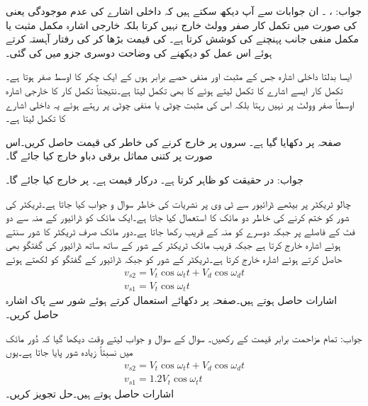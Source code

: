 جواب: ،  ۔ ان جوابات سے آپ دیکھ سکتے ہیں کہ داخلی اشارے کی عدم موجودگی یعنی   کی صورت میں تکمل کار صفر وولٹ خارج نہیں کرتا بلکہ خارجی اشارہ مکمل مثبت یا مکمل منفی جانب پہنچنے کی کوشش کرتا ہے۔ کی قیمت بڑھا کر   کی رفتار آہستہ کرتے ہوئے اس عمل کو دیکھنے کی وضاحت دوسری جزو میں کی گئی۔

ایسا بدلتا داخلی اشارہ جس کے مثبت اور منفی حصے  برابر ہوں کے ایک چکر کا اوسط صفر ہوتا ہے۔تکمل کار ایسے اشارے کا تکمل لیتے ہوئے  کا بھی تکمل لیتا ہے۔نتیجتاً تکمل کار کا خارجی اشارہ اوسطاً صفر وولٹ پر نہیں رہتا بلکہ اس کی مثبت چوٹی  یا منفی چوٹی  پر رہتے ہوئے یہ داخلی اشارے کا تکمل لیتا ہے۔

صفحہ  پر  دکھایا گیا ہے۔ سروں  پر  خارج کرنے کی خاطر  کی قیمت حاصل کریں۔اس صورت   پر کتنی مماثل برقی دباو خارج کیا جائے گا۔

جواب: در حقیقت  کو ظاہر کرتا ہے۔  درکار قیمت ہے۔ پر  خارج کیا جائے گا۔

 
چالو ٹریکٹر پر بیٹھے ڈرائیور سے  ٹی وی پر نشریات کی خاطر سوال و جواب کیا جاتا ہے۔ٹریکٹر کی شور کو ختم کرنے کی خاطر دو مائک کا استعمال کیا جاتا ہے۔ایک مائک کو ڈرائیور کے منہ سے دو فٹ کے فاصلے پر جبکہ دوسرے کو منہ کے قریب رکھا جاتا ہے۔دور مائک صرف ٹریکٹر کا شور سنتے ہوئے  اشارہ خارج کرتا ہے جبکہ قریب مائک ٹریکٹر کے شور کے ساتھ ساتھ ڈرائیور کی گفتگو بھی حاصل کرتے ہوئے اشارہ  خارج کرتا ہے۔ٹریکٹر کے شور کو  جبکہ ڈرائیور کے گفتگو کو  لکھتے ہوئے
\begin{align*}
v_{s2}=V_t \cos \omega_t t +V_d \cos \omega_d t\\
v_{s1}=V_t \cos \omega_t t
\end{align*} 
اشارات حاصل ہوتے ہیں۔صفحہ  پر دکھائے  استعمال کرتے ہوئے شور سے پاک اشارہ حاصل کریں۔

جواب: تمام مزاحمت برابر قیمت کے رکھیں۔
سوال  کے سوال و جواب لیتے وقت دیکھا گیا کہ دُور مائک میں نسبتاً زیادہ شور پایا جاتا ہے۔یوں
\begin{align*}
v_{s2}=V_t \cos \omega_t t +V_d \cos \omega_d t\\
v_{s1}=1.2 V_t \cos \omega_t t
\end{align*} 
اشارات حاصل ہوتے ہیں۔حل تجویز کریں۔

